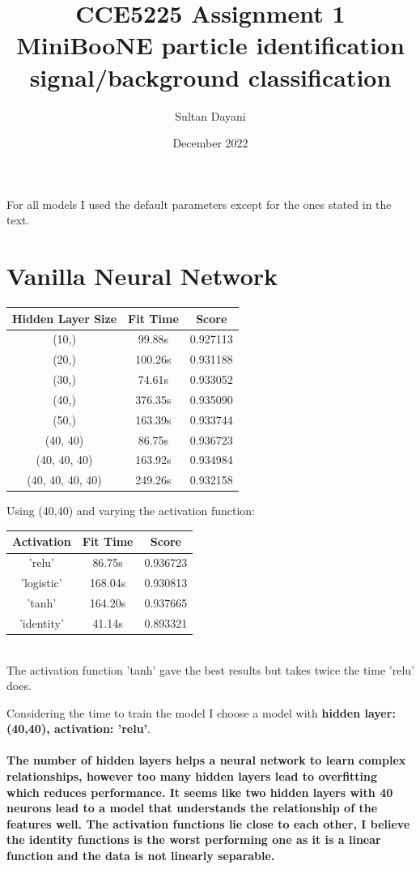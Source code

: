 \documentclass{article}
\title{CCE5225 \dashv{} Assignment 1 \\
\large MiniBooNE particle identification \\ signal/background classification}
\author{Sultan Dayani}
\date{December 2022}
\begin{document}
For all models I used the default parameters except for the ones stated in the text.
\section{Vanilla Neural Network}
\begin{tabular}{|c c c|}
\hline
Hidden Layer Size & Fit Time & Score \\ [0.5ex] 
\hline
(10,) & 99.88s & 0.927113   \\
\hline
(20,) & 100.26s & 0.931188   \\
\hline
(30,) & 74.61s & 0.933052   \\
\hline
\rowcolor{LightYellow}
(40,) & 376.35s & 0.935090   \\
\hline
(50,) & 163.39s & 0.933744   \\ 
\hline
\hline
\rowcolor{LightYellow}
(40, 40) & 86.75s & 0.936723 \\
\hline
(40, 40, 40) & 163.92s & 0.934984 \\
\hline
(40, 40, 40, 40) & 249.26s & 0.932158 \\
\hline
\end{tabular}

Using (40,40) and varying the activation function: \\
\begin{tabular}{|c c c|}
	\hline  
	Activation & Fit Time & Score \\ [0.5ex] 
	\hline
	\rowcolor{LightYellow}
  'relu' & 86.75s & 0.936723 \\ 
  'logistic' & 168.04s & 0.930813 \\ 
  'tanh' & 164.20s & 0.937665 \\ 
  'identity' & 41.14s & 0.893321 \\ 
	\hline
\end{tabular} \\
The activation function 'tanh' gave the best results but takes twice the time 'relu' does.

Considering the time to train the model I choose a model with \textbf{hidden layer: (40,40), activation: 'relu'}.

\paragraph[Comment]{
The number of hidden layers helps a neural network to learn complex relationships, however too many hidden layers lead to overfitting which reduces performance.
It seems like two hidden layers with 40 neurons lead to a model that understands the relationship of the features well.
The activation functions lie close to each other, I believe the identity functions is the worst performing one as it is a linear function and the data is not linearly separable.
}
\end{document}
